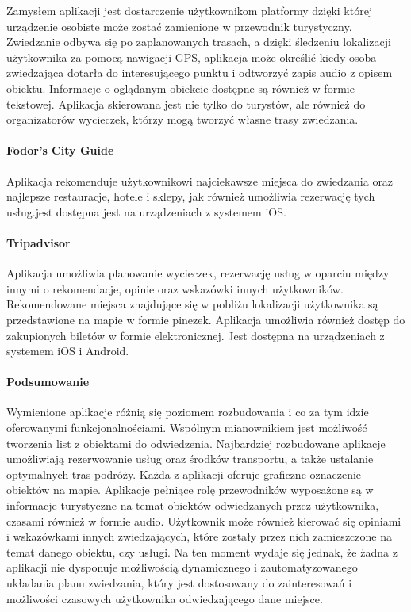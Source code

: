 Zamysłem aplikacji jest dostarczenie użytkownikom platformy dzięki której urządzenie osobiste może zostać zamienione w przewodnik turystyczny.
Zwiedzanie odbywa się po zaplanowanych trasach, a dzięki śledzeniu lokalizacji użytkownika za pomocą nawigacji GPS, aplikacja może określić kiedy
osoba zwiedzająca dotarła do interesującego punktu i odtworzyć zapis audio z opisem obiektu. Informacje o oglądanym obiekcie dostępne są również
w formie tekstowej. Aplikacja skierowana jest nie tylko do turystów, ale również do organizatorów wycieczek, którzy mogą tworzyć własne trasy zwiedzania.

\paragraph{Fodor's City Guide}

Aplikacja rekomenduje użytkownikowi najciekawsze miejsca do zwiedzania oraz najlepsze restauracje, hotele i sklepy, jak również umożliwia rezerwację
tych usług.jest dostępna jest na urządzeniach z systemem iOS.

\paragraph{Tripadvisor}

Aplikacja umożliwia planowanie wycieczek, rezerwację usług  w oparciu między innymi o rekomendacje, opinie oraz wskazówki innych użytkowników.
Rekomendowane miejsca znajdujące się w pobliżu lokalizacji użytkownika są przedstawione na mapie w formie pinezek. Aplikacja umożliwia również dostęp
do zakupionych biletów w formie elektronicznej. Jest dostępna na urządzeniach z systemem iOS i Android.

\paragraph{Podsumowanie}

Wymienione aplikacje różnią się poziomem rozbudowania i co za tym idzie oferowanymi funkcjonalnościami.
Wspólnym mianownikiem jest możliwość tworzenia list z obiektami do odwiedzenia. Najbardziej rozbudowane aplikacje umożliwiają rezerwowanie usług
oraz środków transportu, a także ustalanie optymalnych tras podróży. Każda z aplikacji oferuje graficzne oznaczenie obiektów na mapie. Aplikacje
pełniące rolę przewodników wyposażone są w informacje turystyczne na temat obiektów odwiedzanych przez użytkownika, czasami również w formie audio.
Użytkownik może również kierować się opiniami i wskazówkami innych zwiedzających, które zostały przez nich zamieszczone na temat danego obiektu,
czy usługi. Na ten moment wydaje się jednak, że żadna z aplikacji nie dysponuje możliwością dynamicznego i zautomatyzowanego układania planu zwiedzania,
który jest dostosowany do zainteresowań i możliwości czasowych użytkownika odwiedzającego dane miejsce.
